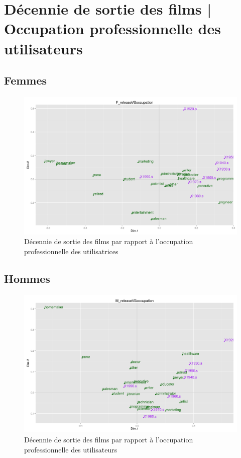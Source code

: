 \section{Décennie de sortie des films | Occupation professionnelle des utilisateurs}
\subsection{Femmes}
\begin{figure}[htd]
\centering
\includegraphics[scale=0.4]{./images/F_releaseVSoccupation}
\caption{Décennie de sortie des films par rapport à l'occupation professionnelle des utilisatrices}
\end{figure}

\subsection{Hommes}
\begin{figure}[htd]
\centering
\includegraphics[scale=0.4]{./images/M_releaseVSoccupation}
\caption{Décennie de sortie des films par rapport à l'occupation professionnelle des utilisateurs}
\end{figure}


